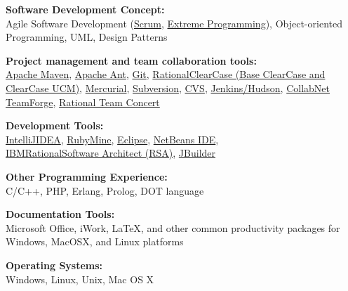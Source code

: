 \documentclass[11pt]{article}
\newcommand{\blankline}{\quad\pagebreak[2]}
\begin{document}
\blankline

{\textbf{Software Development Concept:}}\\
Agile Software Development 
(\href{http://en.wikipedia.org/wiki/Scrum_\%28development\%29}{Scrum}, 
\href{http://www.extremeprogramming.org/}{Extreme Programming}), Object-oriented Programming, UML, Design \nolinebreak Patterns

\blankline

{\textbf{Project management and team collaboration tools:}}\\
\href{http://maven.apache.org/}{Apache Maven},
\href{http://ant.apache.org/}{Apache Ant}, 
\href{http://git-scm.com/}{Git}, \href{http://www-01.ibm.com/software/awdtools/clearcase/index.html}{Rational\textregistered\space ClearCase (Base ClearCase and ClearCase UCM)},
\href{http://mercurial.selenic.com/}{Mercurial},
\href{http://subversion.tigris.org/}{Subversion}, 
\href{http://www.nongnu.org/cvs/}{CVS},
\href{http://jenkins-ci.org/}{Jenkins/Hudson},
\href{http://www.open.collab.net/products/ctf/}{CollabNet TeamForge},
\href{https://jazz.net/projects/rational-team-concert/}{Rational Team Concert}

\blankline

{\textbf{Development Tools:}}\\
\href{http://www.jetbrains.com/idea/}{IntelliJ\textregistered\space IDEA},
\href{http://www.jetbrains.com/ruby}{RubyMine\texttrademark},
\href{http://www.eclipse.org/}{Eclipse},
\href{http://netbeans.org/}{NetBeans IDE}, \\
\href{http://www.ibm.com/developerworks/rational/products/rsa/}{IBM\textregistered\space Rational\textregistered\space Software Architect (RSA)},
\href{http://www.embarcadero.com/products/jbuilder}{JBuilder}

\blankline

{\textbf{Other Programming Experience:}}\\
C/C++, PHP, Erlang, Prolog, DOT language

\blankline

{\textbf{Documentation Tools:}}\\ 
Microsoft Office, iWork, \LaTeX{}, 
and other common productivity packages for Windows, Mac\nolinebreak\space OS\nolinebreak\space X, and
Linux platforms

\blankline

{\textbf{Operating Systems:}}\\
Windows, Linux, Unix, Mac OS X

\end{document}
